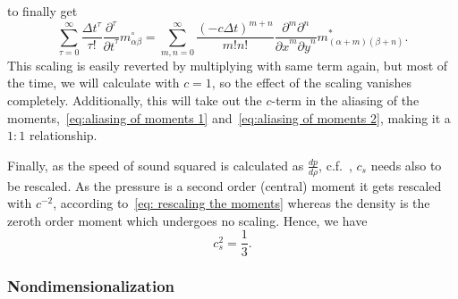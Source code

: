 to finally get
\begin{equation}
  \label{eq: Taylor of moments}
  \sum_{\tau = 0}^\infty \frac{{\Delta t}^\tau }{\tau!} \frac{\partial^\tau}{{\partial t}^\tau} m_{\alpha\beta}^{\circ} =
 \sum_{m,n = 0}^\infty \frac{{(- c\Delta t)}^{m+n}} {m!n!} \frac{\partial^m \partial^n}{ {\partial x}^m{\partial y}^n} m^*_{(\alpha + m)(\beta + n)}.
\end{equation}
This scaling is easily reverted by multiplying with same term again, but most of the time, we will calculate with $c=1$, so the effect of the scaling vanishes completely.
Additionally, this will take out the $c$-term in the aliasing of the moments,~\eqref{eq:aliasing of moments 1} and~\eqref{eq:aliasing of moments 2}, making it a $1:1$ relationship.

Finally, as the speed of sound squared is calculated as $\frac{dp}{d\rho}$, c.f.~\cite[page 175]{wolf2000lattice}, $c_s$ needs also to be rescaled.
As the pressure is a second order (central) moment it gets rescaled with $c^{-2}$, according to~\eqref{eq: rescaling the moments} whereas the density is the zeroth order moment which undergoes no scaling.
Hence, we have
\begin{equation}
   c_s^2 = \frac{1}{3}.
\end{equation}

\subsubsection{Nondimensionalization}
\label{subs:Nondimensionalization}


